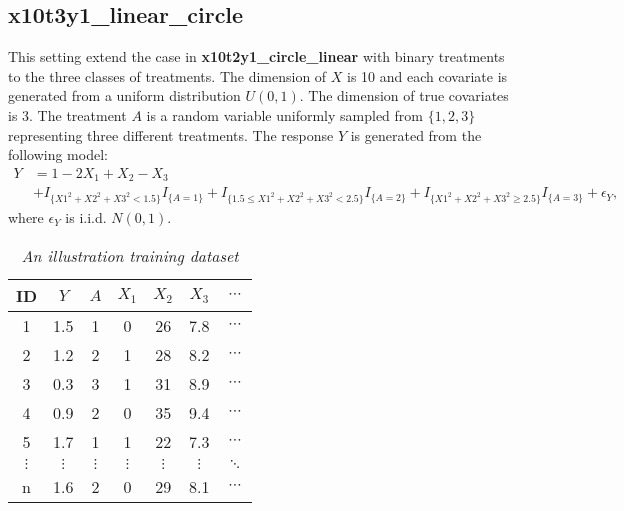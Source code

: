 \documentclass[12pt]{article}
\begin{document}
\subsection*{x10t3y1\_linear\_circle}
This setting extend the case in \textbf{x10t2y1\_circle\_linear} with binary treatments to the three classes of treatments. The dimension of $X$ is 10 and each covariate is generated from a uniform distribution $U(0,1)$. The dimension of true covariates is 3. The treatment $A$ is a random variable uniformly sampled from $\{1,2,3\}$ representing three different treatments. The response $Y$ is generated from the following model: 
\begin{align*}
Y &= 1 -2X_1 + X_2 -X_3\\ &+ I_{\{X1^2+X2^2+X3^2<1.5\}}I_{\{A=1\}} + I_{\{1.5\leq X1^2+X2^2+X3^2<2.5\}}I_{\{A=2\}} + I_{\{X1^2+X2^2+X3^2\geq 2.5\}}I_{\{A=3\}}+ \epsilon_Y,
\end{align*}
where $\epsilon_Y$ is i.i.d. $N(0,1)$.







\newpage

\begin{table}[htbp]
  \centering
  \caption{\emph{An illustration training dataset}}
    \begin{tabular}{c|c|c|cccc}
    \hline
    \hline
    ID & $Y$     & $A$   & $X_1$    & $X_2$    & $X_3$    & $\cdots$ \\
    \hline
    1&1.5  & 1     & 0     & 26    & 7.8   & $\cdots$ \\
    2&1.2  & 2     & 1     & 28    & 8.2   & $\cdots$  \\
    3&0.3  & 3     & 1     & 31    & 8.9   & $\cdots$  \\
    4&0.9  & 2     & 0     & 35    & 9.4   & $\cdots$  \\
    5&1.7  & 1     & 1     & 22    & 7.3   & $\cdots$  \\
    $\vdots$ & $\vdots$    & $\vdots$    & $\vdots$   & $\vdots$     & $\vdots$     & $\ddots$  \\
    n & 1.6 & 2 & 0 & 29 & 8.1 & $\cdots$ \\
    \hline
    \hline
    \end{tabular}%
  \label{tab:TrainingDataExample}%
\end{table}%
\end{document}
